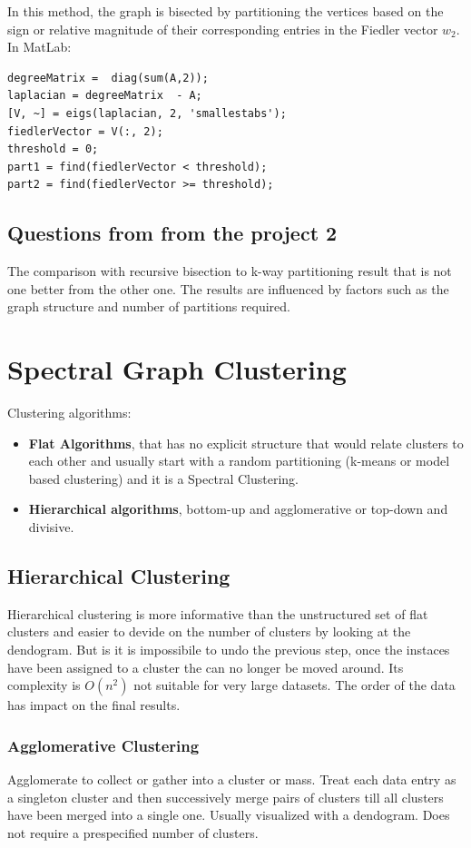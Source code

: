 \documentclass[unicode,11pt,a4paper,oneside,numbers=endperiod,openany]{scrartcl}
\begin{document}
In this method, the graph is bisected by partitioning the vertices based on the sign or relative magnitude of their corresponding entries in the Fiedler vector \( w_2 \).
\newline
In MatLab:
\begin{lstlisting}
degreeMatrix =  diag(sum(A,2));
laplacian = degreeMatrix  - A;
[V, ~] = eigs(laplacian, 2, 'smallestabs');
fiedlerVector = V(:, 2);
threshold = 0;
part1 = find(fiedlerVector < threshold);
part2 = find(fiedlerVector >= threshold);
\end{lstlisting}

\subsection{Questions from from the project 2}
The comparison with recursive bisection to k-way partitioning result that is not one better from the other one. The results are influenced by factors such as the graph structure and number of partitions required.

\section{Spectral Graph Clustering}
Clustering algorithms:
\begin{itemize}
 \item{\textbf{Flat Algorithms}, that has no explicit structure that would relate clusters to each other and usually start with a random partitioning (k-means or model based clustering) and it is a Spectral Clustering.}
 \item{\textbf{Hierarchical algorithms}, bottom-up and agglomerative or top-down and divisive.}
\end{itemize}

\subsection{Hierarchical Clustering}
Hierarchical clustering is more informative than the unstructured set of flat clusters and easier to devide on the number of clusters by looking at the dendogram.\newline
But is it is impossibile to undo the previous step, once the instaces have been assigned to a cluster the can no longer be moved around. Its complexity is $O(n^2)$ not suitable for very large datasets. The order of the data has impact on the final results.
\subsubsection{Agglomerative Clustering}
Agglomerate to collect or gather into a cluster or mass. Treat each data entry as a singleton cluster and then successively merge pairs of clusters till all clusters have been merged into a single one. Usually visualized with a dendogram. Does not require a prespecified number of clusters.
\end{document}
